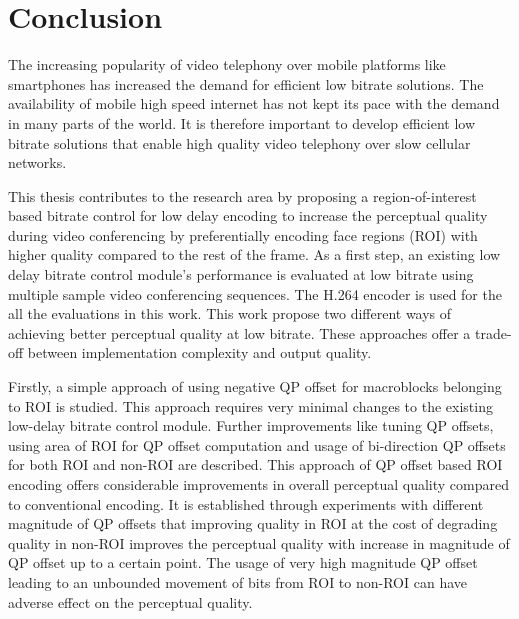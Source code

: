 \chapter{Conclusion} \label{chapter:conclusion}
\thispagestyle{empty}%

The increasing popularity of video telephony over mobile platforms like smartphones has increased the demand for efficient low bitrate solutions. The availability of mobile high speed internet has not kept its pace with the demand in many parts of the world. It is therefore important to develop efficient low bitrate solutions that enable high quality video telephony over slow cellular networks. 

This thesis contributes to the research area by proposing a region-of-interest based bitrate control for low delay encoding to increase the perceptual quality during video conferencing by preferentially encoding face regions (ROI) with higher quality compared to the rest of the frame. As a first step, an existing low delay bitrate control module's performance is evaluated at low bitrate using multiple sample video conferencing sequences. The H.264 encoder is used for the all the evaluations in this work. This work propose two different ways of achieving better perceptual quality at low bitrate. These approaches offer a trade-off between implementation complexity and output quality. 

Firstly, a simple approach of using negative QP offset for macroblocks belonging to ROI is studied. This approach requires very minimal changes to the existing low-delay bitrate control module. Further improvements like tuning QP offsets, using area of ROI for QP offset computation and usage of bi-direction QP offsets for both ROI and non-ROI are described. This approach of QP offset based ROI encoding offers considerable improvements in overall perceptual quality compared to conventional encoding. It is established through experiments with different magnitude of QP offsets that improving quality in ROI at the cost of degrading quality in non-ROI improves the perceptual quality with increase in magnitude of QP offset up to a certain point. The usage of very high magnitude QP offset leading to an unbounded movement of bits from ROI to non-ROI can have adverse effect on the perceptual quality.

